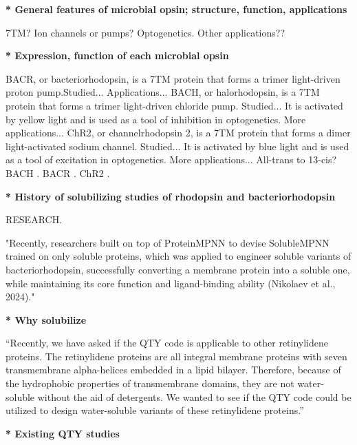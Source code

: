 \documentclass[fleqn,10pt,lineno]{manuscript}
\begin{document}
\textbf{* General features of microbial opsin; structure, function, applications}

7TM? 
Ion channels or pumps? 
Optogenetics. 
Other applications??

\textbf{* Expression, function of each microbial opsin}

\citep{Findlay_1986, Zhang_2011}
BACR, or bacteriorhodopsin, is a 7TM protein that forms a trimer light-driven proton pump.Studied... Applications...
BACH, or halorhodopsin, is a 7TM protein that forms a trimer light-driven chloride pump. Studied... It is activated by yellow light and is used as a tool of inhibition in optogenetics. More applications...
ChR2, or channelrhodopsin 2, is a 7TM protein that forms a dimer light-activated sodium channel. Studied... It is activated by blue light and is used as a tool of excitation in optogenetics. More applications...
All-trans to 13-cis? 
BACH \citep{Baselt_1989, Kouyama_2018}. BACR \citep{Taguchi_2023}. ChR2 \citep{Nagel_2005, Ardevol_2018, Xin_2023}.

\textbf{* History of solubilizing studies of rhodopsin and bacteriorhodopsin}

RESEARCH. 

"Recently, researchers built on top of ProteinMPNN to devise SolubleMPNN trained on only soluble proteins, which was applied to engineer soluble variants of bacteriorhodopsin, successfully converting a membrane protein into a soluble one, while maintaining its core function and ligand-binding ability (Nikolaev et al., 2024)."

\textbf{* Why solubilize}

“Recently, we have asked if the QTY code is applicable to other retinylidene proteins. The retinylidene proteins are all integral membrane proteins with seven transmembrane alpha-helices embedded in a lipid bilayer. Therefore, because of the hydrophobic properties of transmembrane domains, they are not water-soluble without the aid of detergents. We wanted to see if the QTY code could be utilized to design water-soluble variants of these retinylidene proteins.”

\textbf{* Existing QTY studies}
\end{document}
